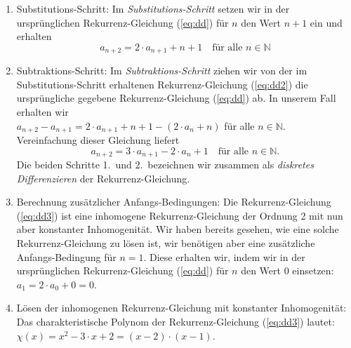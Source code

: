 \begin{enumerate}
\item Substitutions-Schritt: Im \emph{Substitutions-Schritt} setzen wir in der
      urspr\"{u}nglichen Rekurrenz-Gleichung (\ref{eq:dd}) f\"{u}r $n$ den Wert $n + 1$ ein und
      erhalten 
      \begin{equation}
        \label{eq:dd2}
        a_{n+2} = 2 \cdot a_{n+1} + n + 1 \quad \mbox{f\"{u}r alle $n \in \mathbb{N}$}
      \end{equation}
\item Subtraktions-Schritt: Im \emph{Subtraktions-Schritt} ziehen wir von der im
      Substitutions-Schritt erhaltenen Rekurrenz-Gleichung (\ref{eq:dd2}) die urspr\"{u}ngliche
      gegebene Rekurrenz-Gleichung (\ref{eq:dd}) ab.  In unserem Fall erhalten wir \\[0.2cm]
      \hspace*{1.3cm} 
      $a_{n+2} - a_{n+1} = 2 \cdot a_{n+1} + n + 1 - \left( 2 \cdot a_n + n \right)$ 
      \quad f\"{u}r alle $n \in \mathbb{N}$.       \\[0.2cm]
      Vereinfachung dieser Gleichung liefert 
      \begin{equation}
        \label{eq:dd3}
        a_{n+2} = 3 \cdot a_{n+1} - 2 \cdot a_n + 1 \quad \mbox{f\"{u}r alle $n \in \mathbb{N}$}.
      \end{equation}
      Die beiden Schritte 1.~und 2.~bezeichnen wir zusammen als 
      \emph{diskretes Differenzieren} der Rekurrenz-Gleichung.
\item Berechnung zus\"{a}tzlicher Anfangs-Bedingungen: Die Rekurrenz-Gleichung (\ref{eq:dd3})
      ist eine inhomogene Rekurrenz-Gleichung der Ordnung 2 mit nun aber konstanter
      Inhomogenit\"{a}t.  Wir haben bereits gesehen, 
      wie eine solche Rekurrenz-Gleichung zu l\"{o}sen ist, wir ben\"{o}tigen aber eine
      zus\"{a}tzliche Anfangs-Bedingung f\"{u}r $n=1$.  Diese erhalten wir, indem wir in der
      urspr\"{u}nglichen Rekurrenz-Gleichung (\ref{eq:dd}) f\"{u}r $n$ den Wert 0 einsetzen: \\[0.2cm]
      \hspace*{1.3cm} $a_1 = 2 \cdot a_0 + 0 = 0$.
\item L\"{o}sen der inhomogenen Rekurrenz-Gleichung mit konstanter Inhomogenit\"{a}t:
      Das charakteristische Polynom der Rekurrenz-Gleichung (\ref{eq:dd3}) lautet: \\[0.2cm]
      \hspace*{1.3cm} $\chi(x) = x^2 - 3 \cdot x + 2 = (x - 2) \cdot (x - 1)$. \\[0.2cm]

\end{enumerate}
